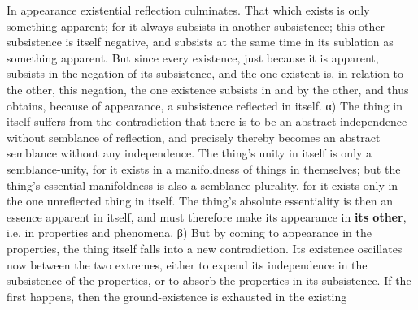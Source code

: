 \documentclass[12pt,a4paper,openany]{book}
\begin{document}
In appearance existential reflection culminates.
That which exists is only something apparent; for it always subsists
in another subsistence; this other subsistence
is itself negative, and subsists at the same time in its sublation
as something apparent. But since every existence, just
because it is apparent, subsists in the negation of
its subsistence, and the one existent is, in relation to
the other, this negation, the one existence subsists
in and by the other, and thus obtains,
because of appearance, a subsistence reflected in itself.
α) The thing in itself suffers from the contradiction that there is to
be an abstract independence without semblance of reflection,
and precisely thereby becomes an abstract semblance without any independence.
The thing's unity in itself is only a semblance-unity,
for it exists in a manifoldness of things in themselves;
but the thing's essential manifoldness is also a
semblance-plurality, for it exists only in the one unreflected
thing in itself. The thing's absolute essentiality is then an essence
apparent in itself, and must therefore make its appearance
in \textbf{its other}, i.e. in properties and phenomena.
β) But by coming to appearance in the properties, the thing
itself falls into a new contradiction. Its existence oscillates
now between the two extremes, either to expend its
independence in the subsistence of the properties, or to
absorb the properties in its subsistence. If the first happens,
then the ground-existence is exhausted in the existing
\setcounter{footnote}{0}%
\end{document}
